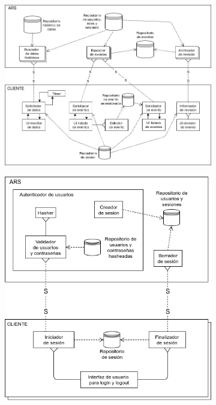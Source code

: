 \begin{figure}[h]
  \begin{subfigure}{\textwidth}
    \includegraphics[width=\textwidth]{imagenes/diagramas/interaccionConClientes.png}
  \end{subfigure}
  \label{}
  \caption{}
\end{figure}

\begin{figure}[h]
  \begin{subfigure}{\textwidth}
    \includegraphics[width=\textwidth]{imagenes/diagramas/loginYLogout.png}
  \end{subfigure}
  \label{}
  \caption{}
\end{figure}
